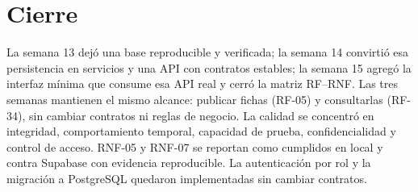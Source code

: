 \documentclass[11pt,a4paper]{article}
\begin{document}
\section*{Cierre}

La semana 13 dejó una base reproducible y verificada; la semana 14 convirtió esa
persistencia en servicios y una API con contratos estables; la semana 15 agregó
la interfaz mínima que consume esa API real y cerró la matriz RF--RNF. Las tres
semanas mantienen el mismo alcance: publicar fichas (RF-05) y consultarlas
(RF-34), sin cambiar contratos ni reglas de negocio. La calidad se concentró en
integridad, comportamiento temporal, capacidad de prueba, confidencialidad y
control de acceso. RNF-05 y RNF-07 se reportan como cumplidos en local y contra
Supabase con evidencia reproducible. La autenticación por rol y la migración a
PostgreSQL quedaron implementadas sin cambiar contratos.
\end{document}
